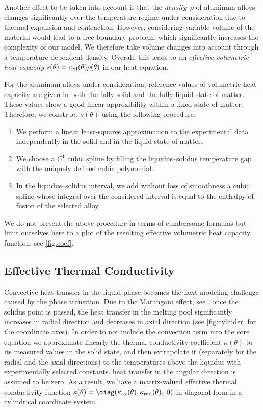 Another effect to be taken into account is that the \emph{density}~$\rho$ of aluminum alloys changes significantly over the temperature regime under consideration due to thermal expansion and contraction.
However, considering variable volume of the material would lead to a free boundary problem, which significantly increases the complexity of our model.
We therefore take volume changes into account through a temperature dependent density.
Overall, this leads to an \emph{effective volumetric heat capacity} $s(\theta) = c_\textup{eff}(\theta) \rho(\theta)$ in our heat equation.

For the aluminum alloys under consideration, reference values of volumetric heat capacity are given in both the fully solid and the fully liquid state of matter. 
These values show a good linear approxibility within a fixed state of matter. 
Therefore, we construct $s(\theta)$ using the following procedure:
\begin{enumerate}
	\item 
		We perform a linear least-squares approximation to the experimental data independently in the solid and in the liquid state of matter.
	\item 
		We choose a $C^1$ cubic spline by filling the liquidus--solidus temperature gap with the uniquely defined cubic polynomial.
	\item 
		In the liquidus--solidus interval, we add without loss of smoothness a cubic spline  whose integral over the considered interval is equal to the enthalpy of fusion of the selected alloy.
\end{enumerate}

We do not present the above procedure in terms of cumbersome formulas but limit ourselves here to a plot of the resulting effective volumetric heat capacity function; see \cref{fig:coef}.


\subsection{Effective Thermal Conductivity}
\label{subsec:conductivity}

Convective heat transfer in the liquid phase becomes the next modeling challenge caused by the phase transition. 
Due to the Marangoni effect, see \cite{MillsKeeneBrooksShirali:1998:1,Saldi:2012:1}, once the solidus point is passed, the heat transfer in the melting pool significantly increases in radial direction and decreases in axial direction (see \cref{fig:cylinder} for the coordinate axes).
In order to not include the convection term into the core equation we approximate linearly the thermal conductivity coefficient $\kappa(\theta)$ to its measured values in the solid state, and then extrapolate it (separately for the radial and the axial directions) to the temperatures above the liquidus with experimentally selected constants. 
 heat transfer in the angular direction is assumed to be zero.
As a result, we have a matrix-valued effective thermal conductivity function $\kappa(\theta) = \diag(\kappa_\textup{ax}(\theta), \kappa_\textup{rad}(\theta),\; 0)$ in diagonal form in a cylindrical coordinate system.

